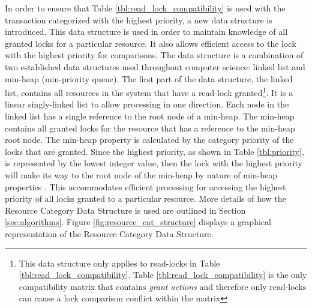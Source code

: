\documentclass[conference]{IEEEtran}
\begin{document}
In order to ensure that Table \ref{tbl:read_lock_compatibility} is used with the transaction categorized with the highest priority, a new data structure is introduced. This data structure is used in order to maintain knowledge of all granted locks for a particular resource. It also allows efficient access to the lock with the highest priority for comparisons. The data structure is a combination of two established data structures used throughout computer science: linked list and min-heap (min-priority queue). The first part of the data structure, the linked list, contains all resources in the system that have a read-lock granted\footnote{This data structure only applies to read-locks in Table \ref{tbl:read_lock_compatibility}. Table \ref{tbl:read_lock_compatibility} is the only compatibility matrix that contains \textit{grant actions} and therefore only read-locks can cause a lock comparison conflict within the matrix}. It is a linear singly-linked list to allow processing in one direction. Each node in the linked list has a single reference to the root node of a min-heap. The min-heap contains all granted locks for the resource that has a reference to the min-heap root node. The min-heap property is calculated by the category priority of the locks that are granted. Since the highest priority, as shown in Table \ref{tbl:priority}, is represented by the lowest integer value, then the lock with the highest priority will make its way to the root node of the min-heap by nature of min-heap properties \cite[p.162]{Cormen_Algorithms}. This accommodates efficient processing for accessing the highest priority of all locks granted to a particular resource. More details of how the Resource Category Data Structure is used are outlined in Section \ref{sec:algorithms}. Figure \ref{fig:resource_cat_structure} displays a graphical representation of the Resource Category Data Structure.
\end{document}
